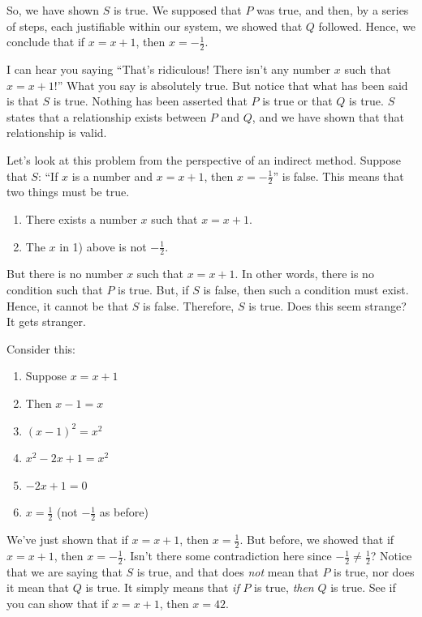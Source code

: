 \documentclass[english]{book}
\begin{document}
So, we have shown $S$ is true. We supposed that $P$ was true, and then, by a series of steps, each justifiable within our system, we showed that $Q$ followed. Hence, we conclude that if $x = x+1$, then $x=-\frac{1}{2}$.

I can hear you saying ``That's ridiculous! There isn't any number $x$ such that $x=x+1$!'' What you say is absolutely true. But notice that what has been said is that $S$ is true. Nothing has been asserted that $P$ is true or that $Q$ is true. $S$ states that a relationship exists between $P$ and $Q$, and we have shown that that relationship is valid. 

Let's look at this problem from the perspective of an indirect method. Suppose that $S$: ``If $x$ is a number and $x = x+1$, then $x=-\frac{1}{2}$'' is false. This means that two things must be true.
\begin{enumerate}[\hspace{1cm}1)]
  \item There exists a number $x$ such that $x = x+1$.
  \item The $x$ in 1) above is not $-\frac{1}{2}$.
\end{enumerate}

But there is no number $x$ such that $x = x+1$. In other words, there is no condition such that $P$ is true. But, if $S$ is false, then such a condition must exist. Hence, it cannot be that $S$ is false. Therefore, $S$ is true. Does this seem strange? It gets stranger.

Consider this:
\begin{enumerate}[\hspace{1cm}1)]
  \item Suppose $x = x+1$
  \item Then $x-1 = x$
  \item $(x-1)^{2} = x^{2}$
  \item $x^{2} - 2x + 1 = x^2$
  \item $-2x+1 = 0$
  \item $x = \frac{1}{2}$ (not $-\frac{1}{2}$ as before)
\end{enumerate}

We've just shown that if $x = x+1$, then $x = \frac{1}{2}$. But before, we showed that if $x = x+1$, then $x=-\frac{1}{2}$. Isn't there some contradiction here since $-\frac{1}{2} \neq \frac{1}{2}$? Notice that we are saying that $S$ is true, and that does \emph{not} mean that $P$ is true, nor does it mean that $Q$ is true. It simply means that \emph{if} $P$ is true, \emph{then} $Q$ is true. See if you can show that if $x = x+1$, then $x=42$.
\end{document}
